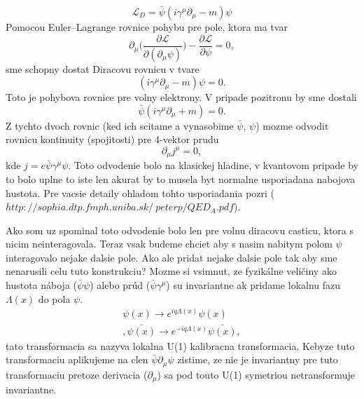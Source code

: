 \documentclass[../../main.tex]{subfiles}
\begin{document}
\begin{equation}
\mathcal{L}_D=\bar{\psi}(i\gamma^{\mu}\partial_{\mu}-m)\psi
\end{equation}
Pomocou Euler–Lagrange rovnice pohybu pre pole, ktora ma tvar
\begin{equation}
\partial_{\mu}\bigg(\frac{\partial \mathcal{L}}{\partial(\partial_{\mu}\psi)}\bigg)-\frac{\partial\mathcal{L}}{\partial\psi}=0,
\end{equation}
sme schopny dostat Diracovu rovnicu v tvare
\begin{equation}
(i\gamma^{\mu}\partial_{\mu}-m)\psi=0.
\end{equation}
Toto je pohybova rovnice pre volny elektrony. V pripade pozitronu by sme dostali
\begin{equation}
\bar{\psi}(i\gamma^{\mu}\partial_{\mu}+m)=0.
\end{equation}
Z tychto dvoch rovnic (ked ich scitame a vynasobime $\bar{\psi}$, $\psi$) mozme odvodit rovnicu kontinuity (spojitosti) pre 4-vektor prudu
\begin{equation}
\partial_{\mu}j^{\mu}=0,
\end{equation}
kde $j=e\bar{\psi}\gamma^{\mu}\psi$.
Toto odvodenie bolo na klasickej hladine, v kvantovom pripade by to bolo uplne to iste len akurat by to musela byt normalne usporiadana nabojova hustota. Pre vacsie detaily ohladom tohto usporiadania pozri ($http://sophia.dtp.fmph.uniba.sk/~peterp/QED_A.pdf$).\par
Ako som uz spominal toto odvodenie bolo len pre volnu diracovu casticu, ktora s nicim neinteragovala. Teraz vsak budeme chciet aby s nasim nabitym polom $\psi$ interagovalo nejake dalsie pole. Ako ale pridat nejake dalsie pole tak aby sme nenarusili celu tuto konstrukciu? Mozme si vsimnut, ze fyzikálne veličiny ako hustota náboja ($\bar{\psi}\psi$) alebo prúd ($\bar{\psi}\gamma^{\mu}$) su invariantne ak pridame lokalnu fazu $\Lambda(x)$ do pola $\psi$.
\begin{equation}
\begin{gathered}
\psi(x)\rightarrow e^{iq\Lambda(x)}\psi(x)\\,
\bar{\psi(x)}\rightarrow e^{-iq\Lambda(x)}\bar{\psi(x)},
\end{gathered}
\end{equation}
tato transformacia sa nazyva lokalna U(1) kalibracna transformacia. Kebyze tuto transformaciu aplikujeme na clen $\bar{\psi}\partial_{\mu}\psi$ zistime, ze nie je invariantny pre tuto transformaciu pretoze derivacia ($\partial_{\mu}$) sa pod touto U(1) symetriou netransformuje invariantne. 
\end{document}
